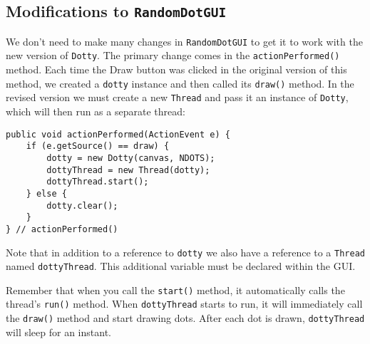 

\subsection*{Modifications to {\tt RandomDotGUI}}

\noindent We don't need to make many changes in {\tt RandomDotGUI} to
get it to work with the new version of {\tt Dotty}. The primary change
comes in the {\tt actionPerformed()} method.  Each time the Draw
button was clicked in the original version of this method, we created
a {\tt dotty} instance and then called its {\tt draw()} method.  In
the revised version we must create a new {\tt Thread} and pass it
an instance of {\tt Dotty}, which will then run as a separate
thread:

\begin{jjjlisting}
\begin{lstlisting}
public void actionPerformed(ActionEvent e) { 
    if (e.getSource() == draw) { 
        dotty = new Dotty(canvas, NDOTS); 
        dottyThread = new Thread(dotty); 
        dottyThread.start(); 
    } else { 
        dotty.clear(); 
    } 
} // actionPerformed()
\end{lstlisting}
\end{jjjlisting}

\noindent Note that in addition to a reference to {\tt dotty}
we also have a reference to a {\tt Thread} named {\tt dottyThread}.
This additional variable must be declared within the GUI.

Remember that when you call the {\tt start()} method, it automatically
calls the thread's {\tt run()} method.   When {\tt dottyThread} starts
to run, it will immediately call the {\tt draw()} method and start
drawing dots.  After each dot is drawn, {\tt dottyThread} will sleep
for an instant.

